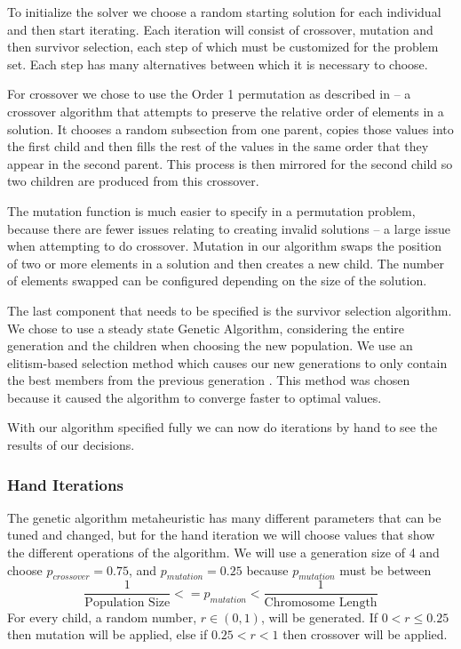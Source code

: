 \documentclass[a4paper]{article}
\begin{document}
To initialize the solver we choose a random starting solution for each individual and then start iterating. Each iteration will consist of crossover, mutation and then survivor selection, each step of which must be customized for the problem set. Each step has many alternatives between which it is necessary to choose.

For crossover we chose to use the Order 1 permutation as described in \cite{Eiben} -- a crossover algorithm that attempts to preserve the relative order of elements in a solution. It chooses a random subsection from one parent, copies those values into the first child and then fills the rest of the values in the same order that they appear in the second parent. This process is then mirrored for the second child so two children are produced from this crossover.

The mutation function is much easier to specify in a permutation problem, because there are fewer issues relating to creating invalid solutions -- a large issue when attempting to do crossover. Mutation in our algorithm swaps the position of two or more elements in a solution and then creates a new child. The number of elements swapped can be configured depending on the size of the solution.

The last component that needs to be specified is the survivor selection algorithm. We chose to use a steady state Genetic Algorithm, considering the entire generation and the children when choosing the new population. We use an elitism-based selection method which causes our new generations to only contain the best members from the previous generation \cite{Talk}. This method was chosen because it caused the algorithm to converge faster to optimal values.

With our algorithm specified fully we can now do iterations by hand to see the results of our decisions.

\subsubsection{Hand Iterations}

The genetic algorithm metaheuristic has many different parameters that can be tuned and changed, but for the hand iteration we will choose values that show the different operations of the algorithm. We will use a generation size of 4 and choose $p_\mathit{crossover}=0.75$, and $p_\mathit{mutation}=0.25$ because $p_\mathit{mutation}$ must be between $$\frac{1}{\text{Population Size}} <= p_\mathit{mutation} < \frac{1}{\text{Chromosome Length}}$$ For every child, a random number, $r \in (0,1)$, will be generated. If $0<r\leq0.25$ then mutation will be applied, else if $0.25<r<1$ then crossover will be applied.
\end{document}
